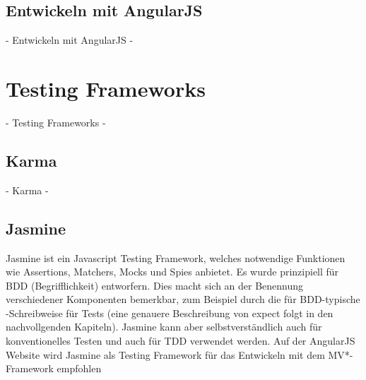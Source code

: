\subsection{Entwickeln mit AngularJS}
 - Entwickeln mit AngularJS -

\newpage
\section{Testing Frameworks}
 - Testing Frameworks -

\subsection{Karma}
 - Karma -

\subsection{Jasmine}
Jasmine ist ein Javascript Testing Framework, welches notwendige Funktionen wie Assertions, Matchers, Mocks und Spies anbietet. Es wurde prinzipiell für BDD (Begrifflichkeit) entworfern. Dies macht sich an der Benennung verschiedener Komponenten bemerkbar, zum Beispiel durch die für BDD-typische -Schreibweise für Tests (eine genauere Beschreibung von expect folgt in den nachvollgenden Kapiteln). Jasmine kann aber selbstverständlich auch für konventionelles Testen und auch für TDD verwendet werden. Auf der AngularJS Website wird Jasmine als Testing Framework für das Entwickeln mit dem MV*-Framework empfohlen %

